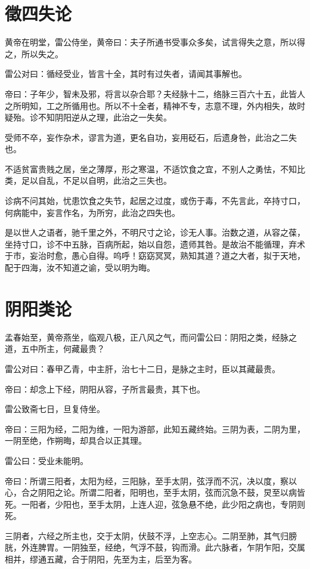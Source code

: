 \documentclass{article}%
\begin{document}
\section{徵四失论}
黄帝在明堂，雷公侍坐，黄帝曰：夫子所通书受事众多矣，试言得失之意，所以得之，所以失之。

雷公对曰：循经受业，皆言十全，其时有过失者，请闻其事解也。

帝曰：子年少，智未及邪，将言以杂合耶？夫经脉十二，络脉三百六十五，此皆人之所明知，工之所循用也。所以不十全者，精神不专，志意不理，外内相失，故时疑殆。诊不知阴阳逆从之理，此治之一失矣。

受师不卒，妄作杂术，谬言为道，更名自功，妄用砭石，后遗身咎，此治之二失也。

不适贫富贵贱之居，坐之薄厚，形之寒温，不适饮食之宜，不别人之勇怯，不知比类，足以自乱，不足以自明，此治之三失也。

诊病不问其始，忧患饮食之失节，起居之过度，或伤于毒，不先言此，卒持寸口，何病能中，妄言作名，为所穷，此治之四失也。

是以世人之语者，驰千里之外，不明尺寸之论，诊无人事。治数之道，从容之葆，坐持寸口，诊不中五脉，百病所起，始以自怨，遗师其咎。是故治不能循理，弃术于市，妄治时愈，愚心自得。呜呼！窈窈冥冥，熟知其道？道之大者，拟于天地，配于四海，汝不知道之谕，受以明为晦。
\section{阴阳类论}
孟春始至，黄帝燕坐，临观八极，正八风之气，而问雷公曰：阴阳之类，经脉之道，五中所主，何藏最贵？

雷公对曰：春甲乙青，中主肝，治七十二日，是脉之主时，臣以其藏最贵。

帝曰：却念上下经，阴阳从容，子所言最贵，其下也。

雷公致斋七日，旦复侍坐。

帝曰：三阳为经，二阳为维，一阳为游部，此知五藏终始。三阴为表，二阴为里，一阴至绝，作朔晦，却具合以正其理。

雷公曰：受业未能明。

帝曰：所谓三阳者，太阳为经，三阳脉，至手太阴，弦浮而不沉，决以度，察以心，合之阴阳之论。所谓二阳者，阳明也，至手太阴，弦而沉急不鼓，炅至以病皆死。一阳者，少阳也，至手太阴，上连人迎，弦急悬不绝，此少阳之病也，专阴则死。

三阴者，六经之所主也，交于太阴，伏鼓不浮，上空志心。二阴至肺，其气归膀胱，外连脾胃。一阴独至，经绝，气浮不鼓，钩而滑。此六脉者，乍阴乍阳，交属相并，缪通五藏，合于阴阳，先至为主，后至为客。
\end{document}
